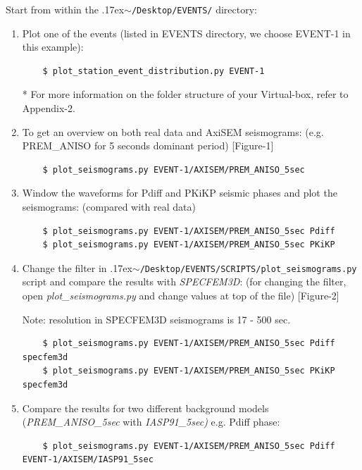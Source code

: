 \documentclass{article}
\newcommand{\ttilde}[0]{\raise.17ex\hbox{$\scriptstyle\sim$}}
\begin{document}
Start from within the \ttilde\verb|/Desktop/EVENTS/| directory:

\begin{enumerate}
    
    \item Plot one of the events (listed in EVENTS directory, we choose EVENT-1 in this
    example):
    
    \begin{verbatim}
    $ plot_station_event_distribution.py EVENT-1
    \end{verbatim}
    * For more information on the folder structure of your Virtual-box, refer to
    Appendix-2.
    
    \item To get an overview on both real data and AxiSEM seismograms: 
    (e.g.  PREM\_ANISO for 5 seconds dominant period) [Figure-1]
    \begin{verbatim}
    $ plot_seismograms.py EVENT-1/AXISEM/PREM_ANISO_5sec
    \end{verbatim}
    
    \item Window the waveforms for Pdiff and PKiKP seismic phases and plot the seismograms: 
    (compared with real data)
    \begin{verbatim}
    $ plot_seismograms.py EVENT-1/AXISEM/PREM_ANISO_5sec Pdiff
    $ plot_seismograms.py EVENT-1/AXISEM/PREM_ANISO_5sec PKiKP
    \end{verbatim}
    
    \item Change the filter in \ttilde\verb|/Desktop/EVENTS/SCRIPTS/plot_seismograms.py| script and compare the
    results with \textit{SPECFEM3D}: (for changing the filter, open
    \textit{plot\_seismograms.py} and change values at top of the file) [Figure-2] 
    
    Note: resolution in SPECFEM3D seismograms is 17 - 500 sec.
    \begin{verbatim}
    $ plot_seismograms.py EVENT-1/AXISEM/PREM_ANISO_5sec Pdiff specfem3d
    $ plot_seismograms.py EVENT-1/AXISEM/PREM_ANISO_5sec PKiKP specfem3d
    \end{verbatim}
    
    \item Compare the results for two different background models
    (\textit{PREM\_ANISO\_5sec} with \textit{IASP91\_5sec)} e.g. Pdiff phase:
    
    \begin{verbatim}
    $ plot_seismograms.py EVENT-1/AXISEM/PREM_ANISO_5sec Pdiff EVENT-1/AXISEM/IASP91_5sec
    \end{verbatim}
    

\end{enumerate}
\end{document}
